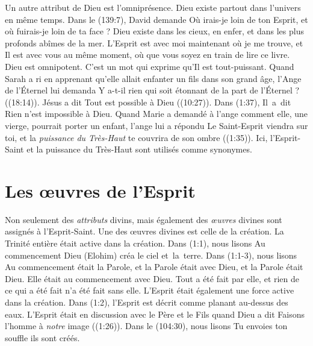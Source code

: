 Un autre attribut de Dieu est l'omniprésence. Dieu existe partout dans
 l'univers en même temps. Dans le (139:7), David demande\frcolon{}
 \Og Où irais-je loin de ton Esprit, et où fuirais-je loin de ta face ? \Fg{}
 Dieu existe dans les cieux, en enfer, et dans les plus profonds abîmes de
 la mer. L'Esprit est avec moi maintenant où je me trouve, et Il est avec vous
 au même moment, où que vous soyez en train de lire ce livre. Dieu est omnipotent.
 C'est un mot qui exprime qu'Il est tout-puissant. Quand Sarah a ri en apprenant
 qu'elle allait enfanter un fils dans son grand âge, l'Ange de l'Éternel lui demanda\frcolon{}
 \Og Y a-t-il rien qui soit étonnant de la part de l'Éternel ? \Fg{}
 ((18:14)). Jésus a dit\frcolon{} \Og Tout est possible à Dieu \Fg{}
 ((10:27)). Dans (1:37), Il~a~dit\frcolon{}
 \Og Rien n'est impossible à Dieu. \Fg{} Quand Marie a demandé à l'ange comment
 elle, une vierge, pourrait porter un enfant, l'ange lui a répondu\frcolon{}
 \Og Le Saint-Esprit viendra sur toi, et la \emph{puissance du Très-Haut} te couvrira
 de son ombre \Fg{} ((1:35)). Ici, l'Esprit-Saint et
 la puissance du Très-Haut sont utilisés comme synonymes.

\section{Les \oe{}uvres de l'Esprit}

Non seulement des \emph{attributs} divins, mais également des \emph{\oe{}uvres}
 divines sont assignés à l'Esprit-Saint.
 Une des œuvres divines est celle de la création.
 La Trinité entière était active dans la création.
 Dans (1:1), nous lisons\frcolon{}
 \Og Au commencement Dieu (Elohim) créa le ciel et~la~terre. \Fg{}
 Dans (1:1-3), nous lisons\frcolon{}
 \Og Au commencement était la Parole, et la Parole était avec Dieu,
 et la Parole était Dieu. Elle était au commencement avec Dieu.
 Tout a été fait par elle, et rien de ce qui a été fait n'a été fait
 sans elle. \Fg{}
 L'Esprit était également une force active dans la création.
 Dans (1:2), l'Esprit est décrit comme planant au-dessus
 des eaux. L'Esprit était en discussion avec le Père et le Fils quand
 Dieu a dit\frcolon{} \Og Faisons l'homme à \emph{notre} image \Fg{} ((1:26)).
 Dans le (104:30), nous lisons\frcolon{}
 \Og Tu envoies ton souffle\frcolon{} ils sont créés. \Fg{}

